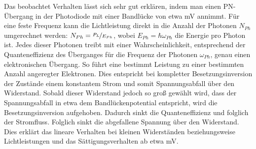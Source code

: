 Das beobachtet Verhalten lässt sich sehr gut erklären, indem man einen PN-Übergang in der Photodiode mit einer Bandlücke von etwa \unit[500]{mV} annimmt. Für eine feste Frequenz kann die Lichtleistung direkt in die Anzahl der Photonen $N_{Ph}$ umgerechnet werden: $N_{Ph} = \nicefrac{P_L}{E_{Ph}}$, wobei $E_{Ph}=\hbar \omega_{Ph}$ die Energie pro Photon ist. Jedes dieser Photonen treibt mit einer Wahrscheinlichkeit, entsprechend der Quanteneffizienz des Überganges für die Frequenz der Photonen $\omega_{Ph}$, genau einen elektronischen Übergang. So führt eine bestimmt Leistung zu einer bestimmten Anzahl angeregter Elektronen. Dies entspricht bei kompletter Besetzungsinversion der Zustände einem konstantem Strom und somit Spannungsabfall über den Widerstand. Sobald dieser Widerstand jedoch so groß gewählt wird, dass der Spannungsabfall in etwa dem Bandlückenpotential entspricht, wird die Besetzungsinversion aufgehoben. Dadurch sinkt die Quanteneffizienz und folglich der Stromfluss. Folglich sinkt die abgefallene Spannung über den Widerstand. Dies erklärt das lineare Verhalten bei kleinen Widerständen beziehungsweise Lichtleistungen und das Sättigungsverhalten ab etwa \unit[250]{mV}.
